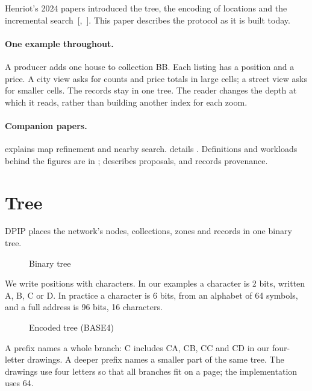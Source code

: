 \documentclass[11pt]{article}
\begin{document}
Henriot's 2024 papers introduced the tree, the encoding of locations and the incremental search~[,~]. This paper describes the protocol as it is built today.

\paragraph{One example throughout.}
A producer adds one house to collection BB. Each listing has a position and a price. A city view asks for counts and price totals in large cells; a street view asks for smaller cells. The records stay in one tree. The reader changes the depth at which it reads, rather than building another index for each zoom.

\paragraph{Companion papers.}
 explains map refinement and nearby search.
 details .
Definitions and workloads behind the figures are in
;
 describes proposals, and  records provenance.

\section{Tree}\hypertarget{ix:tree}{}
DPIP places the network's nodes, collections, zones and records in one binary tree.

\begin{figure}[H]
    \centering
    \caption{Binary tree}
\end{figure}

We write positions with characters. In our examples a character is 2 bits, written A, B, C or D. In practice a character is 6 bits, from an alphabet of 64 symbols, and a full address is 96 bits, 16 characters.

\begin{figure}[H]
    \centering
    \caption{Encoded tree (BASE4)}
\end{figure}

A prefix names a whole branch: C includes CA, CB, CC and CD in our four-letter drawings. A deeper prefix names a smaller part of the same tree. The drawings use four letters so that all branches fit on a page; the implementation uses 64.
\end{document}
